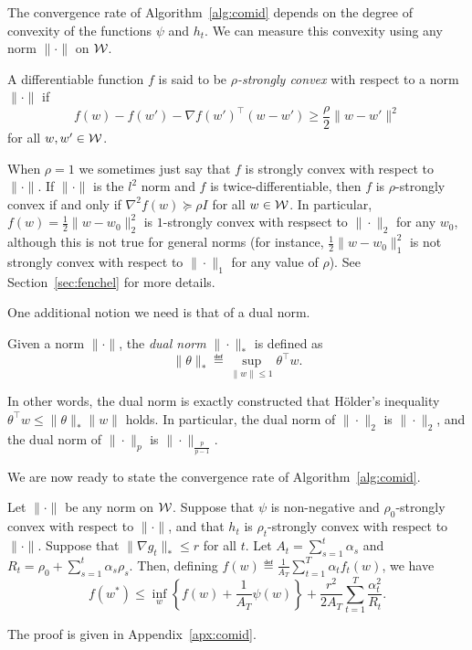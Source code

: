 \documentclass[paper.tex]{subfiles}
\begin{document}
The convergence rate of Algorithm~\ref{alg:comid} depends on the degree of 
convexity of the functions $\psi$ and $h_t$. We can measure this convexity 
using any norm $\|\cdot\|$ on $\mathcal{W}$.
\begin{definition}
A differentiable function $f$ is said to be \emph{$\rho$-strongly convex} with 
respect to a norm $\|\cdot\|$ if
\[ f(w) - f(w') - \nabla f(w')^{\top}(w - w') \geq \frac{\rho}{2}\|w-w'\|^2 \]
for all $w, w' \in \mathcal{W}$.
\end{definition}
When $\rho = 1$ we sometimes just say that $f$ is strongly convex with respect to $\|\cdot\|$.
If $\|\cdot\|$ is the $l^2$ norm and $f$ is twice-differentiable, then $f$ is $\rho$-strongly 
convex if and only if $\nabla^2 f(w) \succeq \rho I$ for all $w \in \mathcal{W}$. In particular, 
$f(w) = \frac{1}{2}\|w - w_0\|_2^2$ is $1$-strongly convex with respsect to $\|\cdot\|_2$ for 
any $w_0$, although this is not true for general norms (for instance, 
$\frac{1}{2}\|w-w_0\|_1^2$ is not strongly convex with respect to $\|\cdot\|_1$ for any value 
of $\rho$). See Section~\ref{sec:fenchel} for more details.

One additional notion we need is that of a dual norm.
\begin{definition}
Given a norm $\|\cdot\|$, the \emph{dual norm} $\|\cdot\|_*$ is defined as 
\[ \|\theta\|_* \eqdef \sup_{\|w\| \leq 1} \theta^{\top}w. \]
\end{definition}
In other words, the dual norm is exactly constructed that H\"{o}lder's 
inequality $\theta^{\top}w \leq \|\theta\|_* \|w\|$ holds. In particular, 
the dual norm of $\|\cdot\|_2$ is $\|\cdot\|_2$, and the dual norm of 
$\|\cdot\|_p$ is $\|\cdot\|_{\frac{p}{p-1}}$.

We are now ready to state the convergence rate of Algorithm~\ref{alg:comid}.
\begin{theorem}
\label{thm:comid}
Let $\|\cdot\|$ be any norm on $\mathcal{W}$. Suppose that $\psi$ is non-negative and $\rho_0$-strongly convex 
with respect to $\|\cdot\|$, and that $h_t$ is $\rho_t$-strongly convex with respect 
to $\|\cdot\|$. Suppose that $\|\nabla g_t\|_* \leq r$ for all $t$. Let 
$A_t = \sum_{s=1}^t \alpha_s$ and $R_t = \rho_0 + \sum_{s=1}^t \alpha_s \rho_s$. 
Then, defining $f(w) \eqdef \frac{1}{A_T} \sum_{t=1}^{T} \alpha_t f_t(w)$, we have
\[ f(w^*) \leq \inf_{w} \left\{ f(w) + \frac{1}{A_T} \psi(w)\right\} + \frac{r^2}{2A_T} \sum_{t=1}^T \frac{\alpha_t^2}{R_t}. \]
\end{theorem}
The proof is given in Appendix~\ref{apx:comid}.
\end{document}

